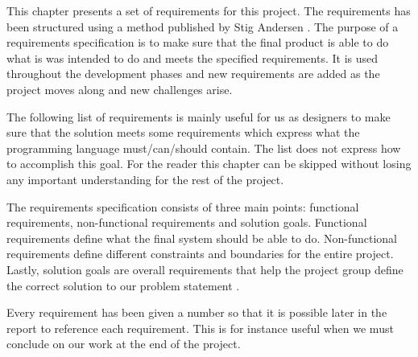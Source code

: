 
This chapter presents a set of requirements for this project. The requirements has been structured using a method published by Stig Andersen \cite{requirementsGuide}. The purpose of a requirements specification is to make sure that the final product is able to do what is was intended to do and meets the specified requirements. It is used throughout the development phases and new requirements are added as the project moves along and new challenges arise.

The following list of requirements is mainly useful for us as designers to make sure that the solution meets some requirements which express what the programming language must/can/should contain. The list does not express how to accomplish this goal. For the reader this chapter can be skipped without losing any important understanding for the rest of the project.

The requirements specification consists of three main points: functional requirements, non-functional requirements and solution goals. Functional requirements define what the final system should be able to do. Non-functional requirements define different constraints and boundaries for the entire project. Lastly, solution goals are overall requirements that help the project group define the correct solution to our problem statement \cite{requirementsGuide}.

Every requirement has been given a number so that it is possible later in the report to reference each requirement. This is for instance useful when we must conclude on our work at the end of the project.


